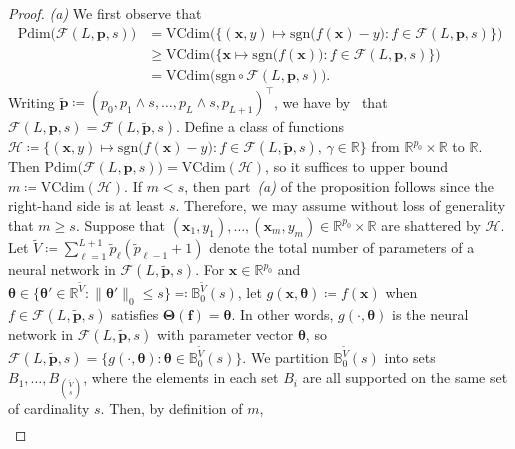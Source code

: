 \documentclass[12pt]{article}
\def\tilde{\widetilde}
\begin{document}
\begin{proof}
    \emph{(a)} We first observe that 
    \begin{align*}
    \mathrm{Pdim}\bigl(\mathcal{F}(L,\bm{p},s)\bigr) &= \mathrm{VCdim}\bigl( \bigl\{(\bm{x},y) \mapsto \mathrm{sgn}\bigl(f(\bm{x})-y\bigr) : f\in\mathcal{F}(L,\bm{p},s)\bigr\} \bigr) \\
    &\geq \mathrm{VCdim}\bigl( \bigl\{\bm{x} \mapsto \mathrm{sgn}\bigl(f(\bm{x})\bigr) : f\in\mathcal{F}(L,\bm{p},s)\bigr\} \bigr) \\
    &= \mathrm{VCdim}\bigl(\mathrm{sgn}\circ\mathcal{F}(L,\bm{p},s)\bigr).
    \end{align*}
    Writing $\tilde{\bm p} \coloneqq (p_0,p_1\wedge s,\ldots,p_L\wedge s, p_{L+1})^\top$, we have by~\citet[Equation~(19)]{schmidt-hieber2020nonparametric} that $\mathcal{F}(L,\bm p,s) = \mathcal{F}(L,\tilde{\bm p},s)$.
    Define a class of functions $\mathcal{H} \coloneqq \bigl\{(\bm{x},y) \mapsto \mathrm{sgn}\bigl(f(\bm{x}) - y\bigr) : f\in\mathcal{F}(L,\tilde{\bm p},s),\, \gamma\in\mathbb{R}\bigr\}$ from $\mathbb{R}^{p_0} \times\mathbb{R}$ to $\mathbb{R}$. Then $\mathrm{Pdim}\bigl(\mathcal{F}(L,\bm{p},s)\bigr) = \mathrm{VCdim}(\mathcal{H})$, so it suffices to upper bound $m\coloneqq \mathrm{VCdim}(\mathcal{H})$. If $m < s$, then part~\emph{(a)} of the proposition follows since the right-hand side is at least $s$. Therefore, we may assume without loss of generality that $m \geq s$. Suppose that $(\bm{x}_1,y_1),\ldots,(\bm{x}_m,y_m)\in\mathbb{R}^{p_0}\times \mathbb{R}$ are shattered by $\mathcal{H}$. Let $\tilde{V}\coloneqq \sum_{\ell=1}^{L+1} \tilde{p}_\ell (\tilde{p}_{\ell-1}+1)$ denote the total number of parameters of a neural network in $\mathcal{F}(L,\tilde{\bm p},s)$. 
    For $\bm{x}\in\mathbb{R}^{p_0}$ and $\bm{\theta} \in \{\bm{\theta}'\in\mathbb{R}^{\tilde{V}} : \|\bm{\theta}'\|_0 \leq s\} \eqqcolon \mathbb{B}_0^{\tilde{V}}(s)$, let $g(\bm{x},\bm{\theta}) \coloneqq f(\bm{x})$ when $f\in\mathcal{F}(L,\tilde{\bm p},s)$ satisfies $\bm{\Theta}(\bm{f}) = \bm{\theta}$. In other words, $g(\cdot,\bm{\theta})$ is the neural network in $\mathcal{F}(L,\tilde{\bm p},s)$ with parameter vector $\bm{\theta}$, so $\mathcal{F}(L,\tilde{\bm p},s) = \bigl\{g(\cdot,\bm{\theta}) : \bm{\theta} \in \mathbb{B}_0^{\tilde{V}}(s)\bigr\}$. We partition $\mathbb{B}_0^{\tilde{V}}(s)$ into sets $B_1,\ldots,B_{\binom{\tilde{V}}{s}}$, where the elements in each set $B_i$ are all supported on the same set of cardinality $s$. Then, by definition of $m$, 
    \begin{align}

\end{align}
\end{proof}
\end{document}

